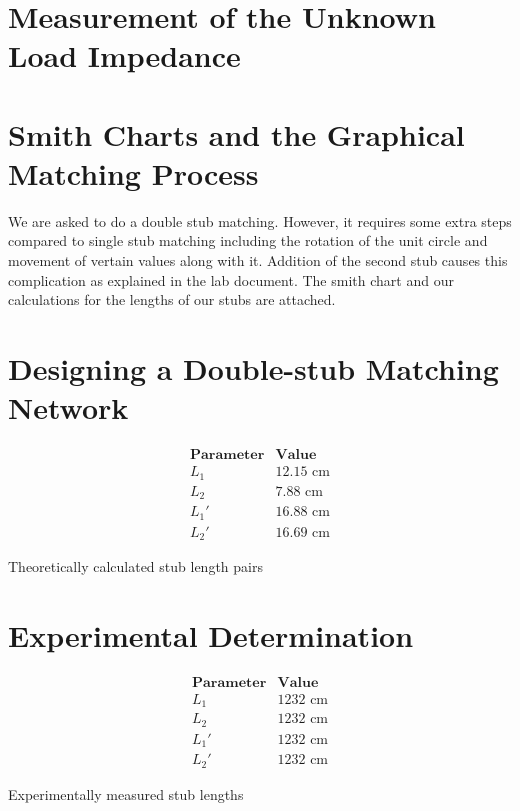 \documentclass[10pt]{article}
\begin{document}
\section{Measurement of the Unknown Load Impedance}


\section{Smith Charts and the Graphical Matching Process}

We are asked to do a double stub matching. However, it requires some extra steps compared to single stub matching
including the rotation of the unit circle and movement of vertain values along with it. Addition of the second stub
causes this complication as explained in the lab document. The smith chart and our calculations for the lengths of 
our stubs are attached.

\section{Designing a Double-stub Matching Network}
\begin{table}[h]
  \[
      \begin{array}{c|c}
          \textbf{Parameter} & \textbf{Value} \\ \hline
          L_1 & 12.15 \text{ cm}\\
          L_2 & 7.88 \text{ cm}\\
          L_1' & 16.88 \text{ cm}\\
          L_2' & 16.69 \text{ cm}
      \end{array}
  \]
  \caption{Theoretically calculated stub length pairs}
\end{table}

\section{Experimental Determination }
\begin{table}[h]
  \[
      \begin{array}{c|c}
          \textbf{Parameter} & \textbf{Value} \\ \hline
          L_1 & 1232 \text{ cm}\\
          L_2 & 1232 \text{ cm}\\
          L_1' & 1232 \text{ cm}\\
          L_2' & 1232 \text{ cm}
      \end{array}
  \]
  \caption{Experimentally measured stub lengths}
\end{table}
\end{document}
